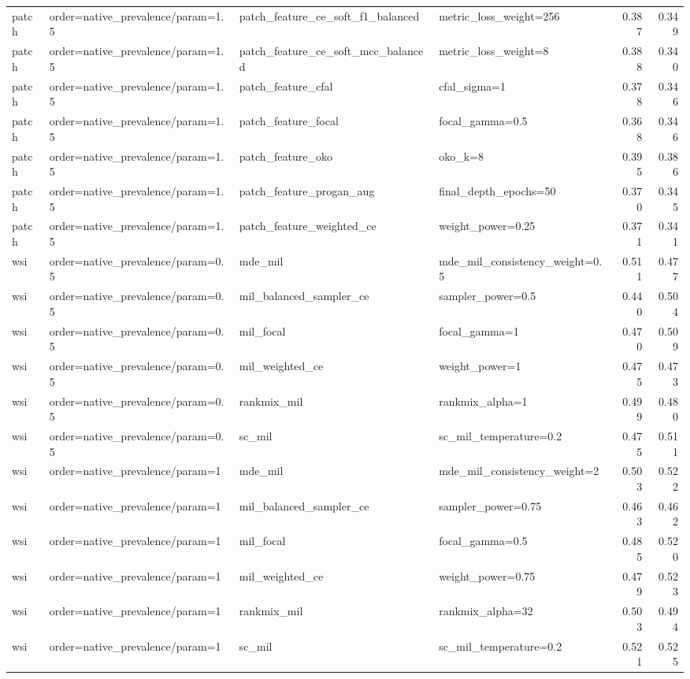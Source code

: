 \begin{tabular}{llllrr}
patch & order=native_prevalence/param=1.5 & patch_feature_ce_soft_f1_balanced & metric_loss_weight=256 & 0.387 & 0.349\\
patch & order=native_prevalence/param=1.5 & patch_feature_ce_soft_mcc_balanced & metric_loss_weight=8 & 0.388 & 0.340\\
patch & order=native_prevalence/param=1.5 & patch_feature_cfal & cfal_sigma=1 & 0.378 & 0.346\\
patch & order=native_prevalence/param=1.5 & patch_feature_focal & focal_gamma=0.5 & 0.368 & 0.346\\
patch & order=native_prevalence/param=1.5 & patch_feature_oko & oko_k=8 & 0.395 & 0.386\\
patch & order=native_prevalence/param=1.5 & patch_feature_progan_aug & final_depth_epochs=50 & 0.370 & 0.345\\
patch & order=native_prevalence/param=1.5 & patch_feature_weighted_ce & weight_power=0.25 & 0.371 & 0.341\\
wsi & order=native_prevalence/param=0.5 & mde_mil & mde_mil_consistency_weight=0.5 & 0.511 & 0.477\\
wsi & order=native_prevalence/param=0.5 & mil_balanced_sampler_ce & sampler_power=0.5 & 0.440 & 0.504\\
wsi & order=native_prevalence/param=0.5 & mil_focal & focal_gamma=1 & 0.470 & 0.509\\
wsi & order=native_prevalence/param=0.5 & mil_weighted_ce & weight_power=1 & 0.475 & 0.473\\
wsi & order=native_prevalence/param=0.5 & rankmix_mil & rankmix_alpha=1 & 0.499 & 0.480\\
wsi & order=native_prevalence/param=0.5 & sc_mil & sc_mil_temperature=0.2 & 0.475 & 0.511\\
wsi & order=native_prevalence/param=1 & mde_mil & mde_mil_consistency_weight=2 & 0.503 & 0.522\\
wsi & order=native_prevalence/param=1 & mil_balanced_sampler_ce & sampler_power=0.75 & 0.463 & 0.462\\
wsi & order=native_prevalence/param=1 & mil_focal & focal_gamma=0.5 & 0.485 & 0.520\\
wsi & order=native_prevalence/param=1 & mil_weighted_ce & weight_power=0.75 & 0.479 & 0.523\\
wsi & order=native_prevalence/param=1 & rankmix_mil & rankmix_alpha=32 & 0.503 & 0.494\\
wsi & order=native_prevalence/param=1 & sc_mil & sc_mil_temperature=0.2 & 0.521 & 0.525\\

\end{tabular}
